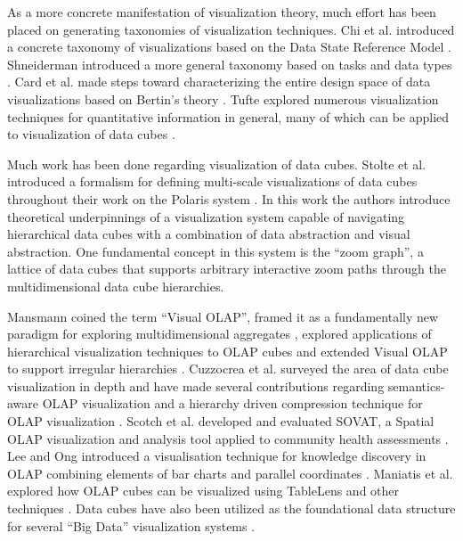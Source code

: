 As a more concrete manifestation of visualization theory, much effort has been placed on generating taxonomies of visualization techniques. Chi et al. introduced a concrete taxonomy of visualizations \cite{chi2000taxonomy} based on the Data State Reference Model \cite{chi1998operator}. Shneiderman introduced a more general taxonomy based on tasks and data types \cite{shneiderman1996eyes}. Card et al. made steps toward characterizing the entire design space of data visualizations based on Bertin's theory \cite{card1997structure}. Tufte explored numerous visualization techniques for quantitative information in general, many of which can be applied to visualization of data cubes \cite{tufte1983visual}.

Much work has been done regarding visualization of data cubes. Stolte et al. introduced a formalism for defining multi-scale visualizations of data cubes throughout their work on the Polaris system \cite{stolte2003multiscale, stolte2002query, stolte2002polaris}. In this work the authors introduce theoretical underpinnings of a visualization system capable of navigating hierarchical data cubes with a combination of data abstraction and visual abstraction. One fundamental concept in this system is the ``zoom graph'', a lattice of data cubes that supports arbitrary interactive zoom paths through the multidimensional data cube hierarchies.

Mansmann coined the term ``Visual OLAP'', framed it as a fundamentally new paradigm for exploring multidimensional aggregates \cite{mansmann2008visual}, explored applications of hierarchical visualization techniques to OLAP cubes \cite{mansmann2007exploring} and extended Visual OLAP to support irregular hierarchies \cite{mansmann2006extending}. Cuzzocrea et al. surveyed the area of data cube visualization in depth \cite{cuzzocrea2009olap} and have made several contributions regarding semantics-aware OLAP visualization \cite{cuzzocrea2007semantics} and a hierarchy driven compression technique for OLAP visualization \cite{cuzzocrea2006hierarchy}. Scotch et al. developed and evaluated SOVAT, a Spatial OLAP visualization and analysis tool applied to community health assessments \cite{scotch2005sovat, scotch2007usability}. Lee and Ong introduced a visualisation technique for knowledge discovery in OLAP combining elements of bar charts and parallel coordinates \cite{lee1995new}. Maniatis et al. explored how OLAP cubes can be visualized using TableLens and other techniques \cite{maniatis2003advanced}. Data cubes have also been utilized as the foundational data structure for several ``Big Data'' visualization systems \cite{lins2013nanocubes, liu2013immens}.


